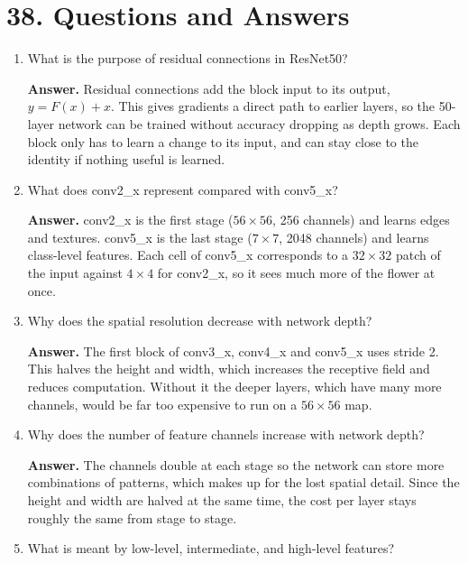 \documentclass[10pt]{article}
\begin{document}
\section*{38. Questions and Answers}

\begin{enumerate}

\item What is the purpose of residual connections in ResNet50?

\textbf{Answer.} Residual connections add the block input to its output, $y=F(x)+x$. This gives gradients a direct path to earlier layers, so the 50-layer network can be trained without accuracy dropping as depth grows. Each block only has to learn a change to its input, and can stay close to the identity if nothing useful is learned.

\item What does conv2\_x represent compared with conv5\_x?

\textbf{Answer.} conv2\_x is the first stage ($56\times56$, 256 channels) and learns edges and textures. conv5\_x is the last stage ($7\times7$, 2048 channels) and learns class-level features. Each cell of conv5\_x corresponds to a $32\times32$ patch of the input against $4\times4$ for conv2\_x, so it sees much more of the flower at once.

\item Why does the spatial resolution decrease with network depth?

\textbf{Answer.} The first block of conv3\_x, conv4\_x and conv5\_x uses stride 2. This halves the height and width, which increases the receptive field and reduces computation. Without it the deeper layers, which have many more channels, would be far too expensive to run on a $56\times56$ map.

\item Why does the number of feature channels increase with network depth?

\textbf{Answer.} The channels double at each stage so the network can store more combinations of patterns, which makes up for the lost spatial detail. Since the height and width are halved at the same time, the cost per layer stays roughly the same from stage to stage.

\item What is meant by low-level, intermediate, and high-level features?


\end{enumerate}
\end{document}
